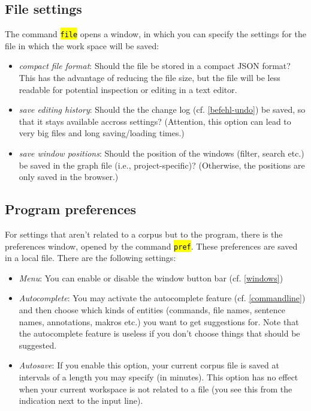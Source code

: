 \documentclass[12pt]{scrartcl}
\newcommand{\code}[1]{\hl{\texttt{#1}}}
\begin{document}
\subsection{File settings}\label{filesettings}

The command \code{file} opens a window, in which you can specify the settings for the file in which the work space will be saved:

\begin{itemize}
	\item	\textit{compact file format}: Should the file be stored in a compact JSON format?
			This has the advantage of reducing the file size, but the file will be less readable for potential inspection or editing in a text editor.
	\item	\textit{save editing history}: Should the the change log (cf. \ref{befehl-undo}) be saved, so that it stays available accross settings?
			(Attention, this option can lead to very big files and long saving/loading times.)
	\item	\textit{save window positions}: Should the position of the windows (filter, search etc.) be saved in the graph file (i.e., project-specific)?
			(Otherwise, the positions are only saved in the browser.)
\end{itemize}


\subsection{Program preferences}\label{preferences}

For settings that aren’t related to a corpus but to the program, there is the preferences window, opened by the command \code{pref}.
These preferences are saved in a local file.
There are the following settings:

\begin{itemize}
	\item \textit{Menu}: You can enable or disable the window button bar (cf. \ref{windows}) 
	\item \textit{Autocomplete}: You may activate the autocomplete feature (cf. \ref{commandline}) and then choose which kinds of entities (commands, file names, sentence names, annotations, makros etc.) you want to get suggestions for. Note that the autocomplete feature is useless if you don’t choose things that should be suggested.
	\item \textit{Autosave}: If you enable this option, your current corpus file is saved at intervals of a length you may specify (in minutes). This option has no effect when your current workspace is not related to a file (you see this from the indication next to the input line).
\end{itemize}
\end{document}

